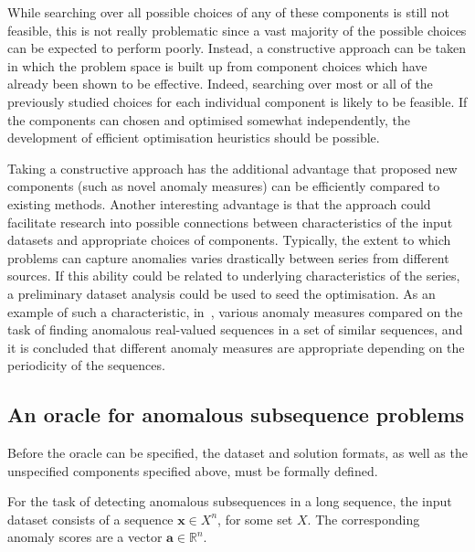 While searching over all possible choices of any of these components is still not feasible, this is not really problematic since a vast majority of the possible choices can be expected to perform poorly. Instead, a constructive approach can be taken in which the problem space is built up from component choices which have already been shown to be effective. Indeed, searching over most or all of the previously studied choices for each individual component is likely to be feasible. If the components can chosen and optimised somewhat independently, the development of efficient optimisation heuristics should be possible.

Taking a constructive approach has the additional advantage that proposed new components (such as novel anomaly measures) can be efficiently compared to existing methods. Another interesting advantage is that the approach could facilitate research into possible connections between characteristics of the input datasets and appropriate choices of components. Typically, the extent to which problems can capture anomalies varies drastically between series from different sources. If this ability could be related to underlying characteristics of the series, a preliminary dataset analysis could be used to seed the optimisation. As an example of such a characteristic, in~\cite{chandola3}, various anomaly measures compared on the task of finding anomalous real-valued sequences in a set of similar sequences, and it is concluded that different anomaly measures are appropriate depending on the periodicity of the sequences.

\subsection{An oracle for anomalous subsequence problems}

Before the oracle can be specified, the dataset and solution formats, as well as the unspecified components specified above, must be formally defined.

For the task of detecting anomalous subsequences in a long sequence, the input dataset consists of a sequence $\mathbf{x} \in X^n$, for some set $X$. The corresponding anomaly scores are a vector $\mathbf{a} \in \mathbb{R}^n$.

